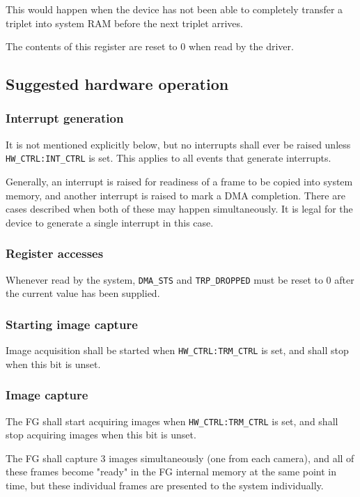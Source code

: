 \documentclass[12pt]{article}
\begin{document}
This would happen when the device has not been able to completely transfer a triplet into system RAM before the next triplet arrives.

The contents of this register are reset to 0 when read by the driver.

\subsection{Suggested hardware operation}

\subsubsection{Interrupt generation}

It is not mentioned explicitly below, but no interrupts shall ever be raised unless \texttt{HW\_CTRL:INT\_CTRL} is set. This applies to all events that generate interrupts.

Generally, an interrupt is raised for readiness of a frame to be copied into system memory, and another interrupt is raised to mark a DMA completion. There are cases described when both of these may happen simultaneously. It is legal for the device to generate a single interrupt in this case.

\subsubsection{Register accesses}

Whenever read by the system, \texttt{DMA\_STS} and \texttt{TRP\_DROPPED} must be reset to 0 after the current value has been supplied.

\subsubsection{Starting image capture}

Image acquisition shall be started when \texttt{HW\_CTRL:TRM\_CTRL} is set, and shall stop when this bit is unset.

\subsubsection{Image capture}

The FG shall start acquiring images when \texttt{HW\_CTRL:TRM\_CTRL} is set, and shall stop acquiring images when this bit is unset.

The FG shall capture 3 images simultaneously (one from each camera), and all of
these frames become "ready" in the FG internal memory at the same point in time, but these individual frames are presented to the system individually.
\end{document}
